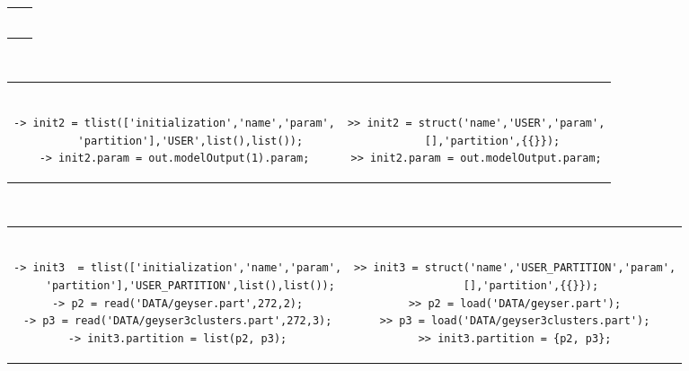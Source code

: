 \begin{itemize}
\begin{itemize}
\begin{tabular}{c|c}
\begin{minipage}[c]{0.58\columnwidth}
{\begin{verbatim}
\end{verbatim}}
	\end{minipage}%
	\end{tabular}\\



	\begin{tabular}{c|c}
	\begin{minipage}[c]{0.47\columnwidth}%
{\scriptsize
	\begin{verbatim}

-> init2 = tlist(['initialization','name','param',
     'partition'],'USER',list(),list());
-> init2.param = out.modelOutput(1).param;

\end{verbatim}}
	\end{minipage}%
&
	\begin{minipage}[c]{0.58\columnwidth}%
{\scriptsize
	\begin{verbatim}

>> init2 = struct('name','USER','param',
     [],'partition',{{}});
>> init2.param = out.modelOutput.param;

\end{verbatim}}
	\end{minipage}%
	\end{tabular}\\



\begin{tabular}{c|c}
	\begin{minipage}[c]{0.47\columnwidth}%
	{\scriptsize
	\begin{verbatim}

-> init3  = tlist(['initialization','name','param',
    'partition'],'USER_PARTITION',list(),list());
-> p2 = read('DATA/geyser.part',272,2);
-> p3 = read('DATA/geyser3clusters.part',272,3);
-> init3.partition = list(p2, p3);

\end{verbatim}}
	\end{minipage}%
&
	\begin{minipage}[c]{0.58\columnwidth}%
	{\scriptsize
	\begin{verbatim}

>> init3 = struct('name','USER_PARTITION','param',
     [],'partition',{{}});
>> p2 = load('DATA/geyser.part');
>> p3 = load('DATA/geyser3clusters.part');
>> init3.partition = {p2, p3};

\end{verbatim}}
	\end{minipage}%
	\end{tabular}\\







\end{itemize}
\end{itemize}
